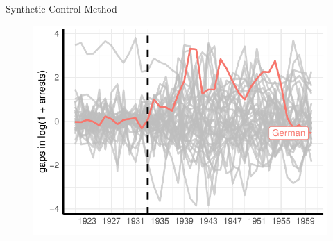 \documentclass[11pt]{beamer}
\begin{document}




\begin{frame}{Synthetic Control Method}
 \begin{figure}[h]
\centering
\includegraphics[width=1\textwidth]{placebo_highlight_all_imp_date.pdf}
\label{fig:sc_placebo_gaps_all}
\end{figure}
\end{frame}




\end{document}
